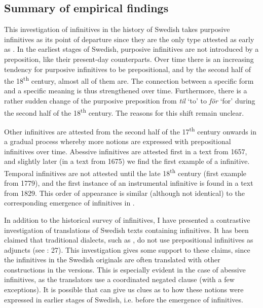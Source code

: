 \documentclass[output=paper]{langscibook}
\begin{document}
\subsection{Summary of empirical findings}\label{sec:kalm:4.4}


This investigation of  infinitives in the history of Swedish takes purposive infinitives as its point of departure since they are the only type attested as early as . In the earliest stages of Swedish, purposive infinitives are not introduced by a preposition, like their present-day counterparts. Over time there is an increasing tendency for purposive infinitives to be prepositional, and by the second half of the 18\textsuperscript{th} century, almost all of them are. The connection between a specific form and a specific meaning is thus strengthened over time. Furthermore, there is a rather sudden change of the purposive preposition from \textit{til} ‘to’ to \textit{för} ‘for’ during the second half of the 18\textsuperscript{th} century. The reasons for this shift remain unclear. 



Other  infinitives are attested from the second half of the 17\textsuperscript{th} century onwards in a gradual process whereby more  notions are expressed with prepositional infinitives over time. Abessive infinitives are attested first in a text from 1657, and slightly later (in a text from 1675) we find the first example of a  infinitive. Temporal infinitives are not attested until the late 18\textsuperscript{th} century (first example from 1779), and the first instance of an instrumental infinitive is found in a text from 1829. This order of appearance is similar (although not identical) to the corresponding emergence of  infinitives in . 



In addition to the historical survey of  infinitives, I have presented a contrastive investigation of  translations of Swedish texts containing  infinitives. It has been claimed that traditional dialects, such as , do not use prepositional infinitives as  adjuncts (see \citealt{Holm1967}: 27). This investigation gives some support to these claims, since the  infinitives in the Swedish originals are often translated with other constructions in the  versions. This is especially evident in the case of abessive infinitives, as the translators use a coordinated negated clause (with a few exceptions). It is possible that  can give us clues as to how these  notions were expressed in earlier stages of Swedish, i.e. before the emergence of  infinitives. 
\end{document}
